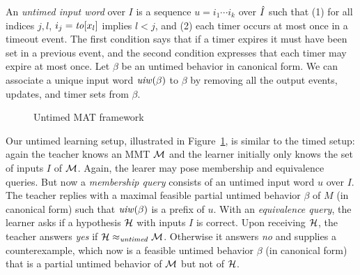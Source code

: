 An \emph{untimed input word} over $I$ is a sequence $u = i_1 \cdots i_k$ over $\hat{I}$ such that (1)
for all indices $j, l$, $i_j = \mathit{to}[x_l]$ implies $l < j$, and (2) each timer occurs at most once in a timeout event.
The first condition  says that if a timer expires it must have been set in a previous event, and the second condition  expresses that
each timer may expire at most once.
Let $\beta$ be an untimed behavior in canonical form.
We can associate a unique input word $\mathit{uiw}(\beta)$ to $\beta$ by removing all the output events,
updates, and timer sets from $\beta$.
\iflong
\begin{figure}
\begin{center}
\end{center}    
\caption{Untimed MAT framework}
\label{fig:untimed MAT}
\end{figure}
\fi

Our untimed learning setup, illustrated in Figure~\ref{fig:untimed MAT}, is similar to the timed setup:
again the teacher knows an MMT ${\mathcal M}$ and the learner initially only knows the set of inputs $I$ of ${\mathcal M}$.
Again, the learer may pose membership and equivalence queries.
But now a \emph{membership query} consists of an untimed input word $u$ over $I$.
The teacher replies with a maximal feasible partial untimed behavior $\beta$ of $M$ (in canonical form) such that
$\mathit{uiw}(\beta)$ is a prefix of $u$.
With an \emph{equivalence query}, the learner asks if a hypothesis ${\mathcal H}$ with inputs $I$ is correct.
Upon receiving ${\mathcal H}$, the teacher answers \emph{yes} if ${\mathcal H} \approx_{\mathit{untimed}} {\mathcal M}$.
Otherwise it answers \emph{no} and supplies a counterexample, which now is a feasible untimed behavior $\beta$ (in canonical form) that
is a partial untimed behavior of ${\mathcal M}$ but not of ${\mathcal H}$.

